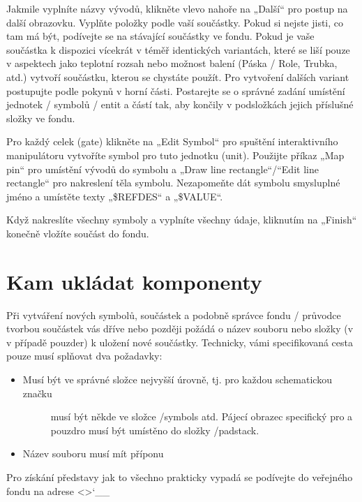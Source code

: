 \documentclass[letterpaper,10pt,czech]{sphinxmanual}
\begin{document}
Jakmile vyplníte názvy vývodů, klikněte vlevo nahoře na „Další“ pro postup na další obrazovku. Vyplňte položky podle  vaší součástky. Pokud si nejste jisti, co tam má být, podívejte se na stávající součástky ve fondu. Pokud je vaše součástka k dispozici vícekrát v téměř identických variantách, které se liší pouze v aspektech jako teplotní rozsah nebo možnost balení (Páska / Role, Trubka, atd.) vytvoří součástku, kterou se chystáte použít. Pro vytvoření dalších variant postupujte podle pokynů v horní části. Postarejte se o správné zadání umístění jednotek / symbolů / entit a částí tak, aby končily v podsložkách jejich příslušné složky ve fondu.

Pro každý celek (gate) klikněte na „Edit Symbol“ pro spuštění interaktivního
manipulátoru vytvoříte symbol pro tuto jednotku (unit). Použijte příkaz „Map pin“
pro umístění vývodů do symbolu a „Draw line rectangle“/“Edit line
rectangle“ pro nakreslení těla symbolu. Nezapomeňte dát symbolu
smysluplné jméno a umístěte texty „\$REFDES“ a „\$VALUE“.

Když nakreslíte všechny symboly a vyplníte všechny údaje,
kliknutím na „Finish“ konečně vložíte součást do fondu.


\section{Kam ukládat komponenty}
\label{\detokenize{pool-mgr_cz:kam-ukladat-komponenty}}
Při vytváření nových symbolů, součástek a podobně správce fondu / průvodce  tvorbou součástek vás dříve nebo později požádá o název souboru nebo složky (v
v případě pouzder) k uložení nové součástky. Technicky, vámi specifikovaná cesta pouze musí splňovat dva požadavky:
\begin{itemize}
\item {} \begin{description}
\item[{Musí být ve správné  složce nejvyšší úrovně, tj. pro každou schematickou značku}] \leavevmode
musí být někde ve složce /symbols atd. Pájecí obrazec specifický pro a
pouzdro musí být umístěno do složky /padstack.

\end{description}

\item {} 
Název souboru musí mít příponu 

\end{itemize}

Pro získání představy jak to všechno prakticky vypadá se podívejte do veřejného fondu na adrese
\textless{}\textgreater{}{}`\_\_
\end{document}
